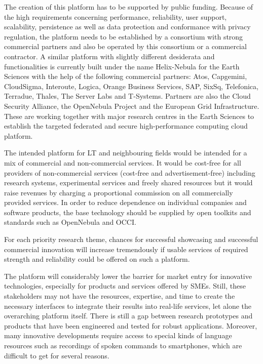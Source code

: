 \documentclass[10pt, plain]{../../metanetpaper}
\begin{document}
\begin{multicols}{2}
The creation of this platform has to be supported by public funding. Because of the high requirements concerning performance, reliability, user support, scalability, persistence as well as data protection and conformance with privacy regulation, the platform needs to be established by a consortium with strong commercial partners and also be operated by this consortium or a commercial contractor. A similar platform with slightly different desiderata and functionalities is currently built under the name Helix-Nebula for the Earth Sciences with the help of the following commercial partners: Atos, Capgemini, CloudSigma, Interoute, Logica, Orange Business Services, SAP, SixSq, Telefonica, Terradue, Thales, The Server Labs and T-Systems. Partners are also the Cloud Security Alliance, the OpenNebula Project and the European Grid Infrastructure. These are working together with major research centres in the Earth Sciences to establish the targeted federated and secure high-performance computing cloud platform.
 
The intended platform for LT and neighbouring fields would be intended for a mix of commercial and non-commercial services. It would be cost-free for all providers of non-commercial services (cost-free and advertisement-free) including research systems, experimental services and freely shared resources but it would raise revenues by charging a proportional commission on all commercially provided services. In order to reduce dependence on individual companies and software products, the base technology should be supplied by open toolkits and standards such as OpenNebula and OCCI.  
 
For each priority research theme, chances for successful showcasing and successful commercial innovation will increase tremendously if usable services of required strength and reliability could be offered on such a platform.
 
The platform will considerably lower the barrier for market entry for innovative technologies, especially for products and services offered by SMEs. Still, these stakeholders may not have the resources, expertise, and time to create the necessary interfaces to integrate their results into real-life services, let alone the overarching platform itself. There is still a gap between research prototypes and products that have been engineered and tested for robust applications. Moreover, many innovative developments require access to special kinds of language resources such as recordings of spoken commands to smartphones, which are difficult to get for several reasons.
 

\end{multicols}
\end{document}

